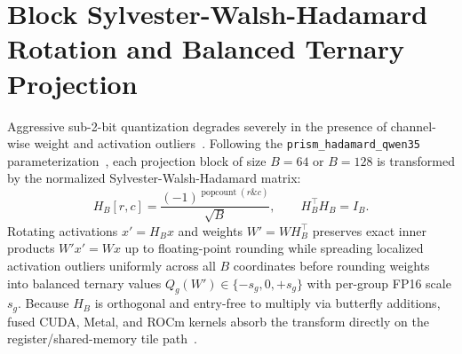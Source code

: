 \documentclass[11pt,a4paper]{article}
\begin{document}
\begin{table}[ht]
\centering
{}
\caption{Hybrid 3:1 Gated-DeltaNet + GQA architectural specifications across the Zen 6 family.}
\label{tab:arch}
\end{table}

\section{Block Sylvester-Walsh-Hadamard Rotation and Balanced Ternary Projection}

Aggressive sub-2-bit quantization degrades severely in the presence of channel-wise weight and activation outliers~\cite{ma2024bitnet,ashkboos2024quarot,tseng2024quip}. Following the \texttt{prism\_hadamard\_qwen35} parameterization~\cite{prismml2026bonsai2}, each projection block of size $B = 64$ or $B = 128$ is transformed by the normalized Sylvester-Walsh-Hadamard matrix:
\begin{equation}
H_B[r, c] = \frac{(-1)^{\operatorname{popcount}(r \mathbin{\&} c)}}{\sqrt{B}}, \qquad H_B^\top H_B = I_B.
\end{equation}
Rotating activations $x' = H_B x$ and weights $W' = W H_B^\top$ preserves exact inner products $W' x' = W x$ up to floating-point rounding while spreading localized activation outliers uniformly across all $B$ coordinates before rounding weights into balanced ternary values $Q_g(W') \in \{-s_g, 0, +s_g\}$ with per-group FP16 scale $s_g$. Because $H_B$ is orthogonal and entry-free to multiply via butterfly additions, fused CUDA, Metal, and ROCm kernels absorb the transform directly on the register/shared-memory tile path~\cite{ashkboos2024quarot,tseng2024quip}.
\end{document}
